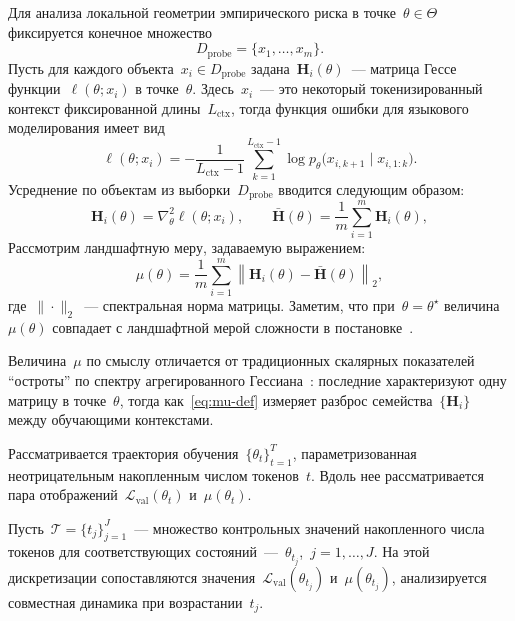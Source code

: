 \documentclass[11pt]{ubs}
\begin{document}
Для анализа локальной геометрии эмпирического риска в точке~$\theta\in\Theta$ фиксируется конечное множество
\[
  D_{\mathrm{probe}} = \{x_1,\ldots,x_m\}.
\]
Пусть для каждого объекта~$x_i\in D_{\mathrm{probe}}$ задана~$\mathbf{H}_i(\theta)$~--- матрица Гессе функции~$\ell(\theta;x_i)$ в точке~$\theta$.
Здесь~$x_i$~--- это некоторый токенизированный контекст фиксированной длины~$L_{\mathrm{ctx}}$, тогда функция ошибки для языкового моделирования имеет вид
\[
  \ell(\theta;x_i)= -\frac{1}{L_{\mathrm{ctx}}-1}\sum_{k=1}^{L_{\mathrm{ctx}}-1}\log p_\theta\bigl(x_{i,k+1}\mid x_{i,1:k}\bigr).
\]
Усреднение по объектам из выборки~$D_{\mathrm{probe}}$ вводится следующим образом:
\begin{equation}\label{eq:probe-hessians}
  \mathbf{H}_i(\theta)=\nabla_\theta^2 \ell(\theta;x_i), \qquad
  \bar{\mathbf{H}}(\theta)=\frac{1}{m}\sum_{i=1}^{m}\mathbf{H}_i(\theta),
\end{equation}
Рассмотрим ландшафтную меру, задаваемую выражением:
\begin{equation}\label{eq:mu-def}
  \mu(\theta)=\frac{1}{m}\sum_{i=1}^{m}\left\|\mathbf{H}_i(\theta)-\bar{\mathbf{H}}(\theta)\right\|_2,
\end{equation}
где~$\|\cdot\|_2$~--- спектральная норма матрицы.
Заметим, что при~$\theta=\theta^\star$ величина~$\mu(\theta)$ совпадает с ландшафтной мерой сложности в постановке~\cite{kiselev2024}.

Величина~$\mu$ по смыслу отличается от традиционных скалярных показателей ``остроты'' по спектру агрегированного Гессиана~\cite{ghorbani2019,papyan2019,wu2022dissecting}: последние характеризуют одну матрицу в точке~$\theta$, тогда как~\eqref{eq:mu-def} измеряет разброс семейства~$\{\mathbf{H}_i\}$ между обучающими контекстами.

Рассматривается траектория обучения~$\{\theta_t\}_{t=1}^{T}$, параметризованная неотрицательным накопленным числом токенов~$t$.
Вдоль нее рассматривается пара отображений~$\mathcal{L}_{\mathrm{val}}(\theta_t)$ и~$\mu(\theta_t)$.

Пусть~$\mathcal{T}=\{t_j\}_{j=1}^{J}$~--- множество контрольных значений накопленного числа токенов для соответствующих состояний~---~$\theta_{t_j}$,~$j=1,\ldots,J$.
На этой дискретизации сопоставляются значения~$\mathcal{L}_{\mathrm{val}}(\theta_{t_j})$ и~$\mu(\theta_{t_j})$, анализируется совместная динамика при возрастании~$t_j$.
\end{document}
